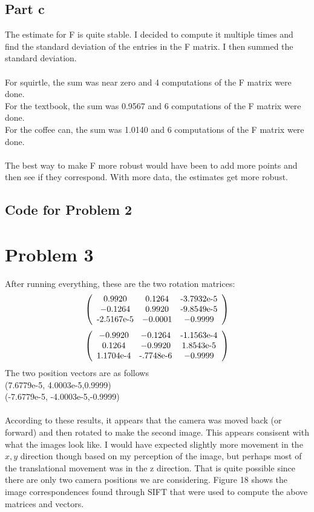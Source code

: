 \documentclass[11pt,psfig]{article}
\begin{document}
\newpage

\subsection*{Part c}

The estimate for F is quite stable. I decided to compute it multiple times and find the standard deviation of the entries in the F matrix. I then summed the standard deviation. \\
\\
For squirtle, the sum was near zero and 4 computations of the F matrix were done.\\
For the textbook, the sum was 0.9567 and 6 computations of the F matrix were done.\\
For the coffee can, the sum was 1.0140 and 6 computations of the F matrix were done. \\
\\
The best way to make F more robust would have been to add more points and then see if they correspond. With more data, the estimates get more robust. 

\subsection*{Code for Problem 2}



\newpage

\section*{Problem 3}

After running everything, these are the two rotation matrices:
\[ \left( \begin{array}{ccc}
0.9920 & 0.1264 & $-3.7932e-5$\\
-0.1264 &  0.9920 & $-9.8549e-5$\\		
$-2.5167e-5$ & -0.0001 & -0.9999 \end{array} \right)\] 
\[ \left( \begin{array}{ccc}
-0.9920 & -0.1264 & $-1.1563e-4$\\
0.1264 &  -0.9920 & $1.8543e-5$\\		
$1.1704e-4$ & $-.7748e-6$ & -0.9999 \end{array} \right)\] 
The two position vectors are as follows\\
(7.6779e-5, 4.0003e-5,0.9999)
\\
(-7.6779e-5, -4.0003e-5,-0.9999)
\\
\\
According to these results, it appears that the camera was moved back (or forward) and then rotated to make the second image. This appears consisent with what the images look like. I would have expected slightly more movement in the $x,y$ direction though based on my perception of the image, but perhaps most of the translational movement was in the z direction. That is quite possible since there are only two camera positions we are considering. Figure 18 shows the image correspondences found through SIFT that were used to compute the above matrices and vectors.
\end{document}
